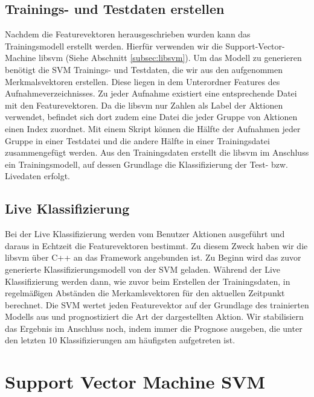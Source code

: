 \subsection{Trainings- und Testdaten erstellen}
\label{subsec:trainings-und-testdaten-erstellen}
Nachdem die Featurevektoren herausgeschrieben wurden kann das Trainingsmodell erstellt werden. Hierfür verwenden wir die Support-Vector-Machine libsvm (Siehe Abschnitt \ref{subsec:libsvm}). Um das Modell zu generieren benötigt die SVM Trainings- und Testdaten, die wir aus den aufgenommen Merkmalsvektoren erstellen. Diese liegen in dem Unterordner \glqq{}Features\grqq{} des Aufnahmeverzeichnisses. Zu jeder Aufnahme existiert eine entsprechende Datei mit den Featurevektoren. Da die libsvm nur Zahlen als Label der Aktionen verwendet, befindet sich dort zudem eine Datei die jeder Gruppe von Aktionen einen Index zuordnet. Mit einem Skript können die Hälfte der Aufnahmen jeder Gruppe in einer Testdatei und die andere Hälfte in einer Trainingsdatei zusammengefügt werden. Aus den Trainingsdaten erstellt die libsvm im Anschluss ein Trainingsmodell, auf dessen Grundlage die Klassifizierung der Test- bzw. Livedaten erfolgt.

\subsection{Live Klassifizierung}
Bei der Live Klassifizierung werden vom Benutzer Aktionen ausgeführt und daraus in Echtzeit die Featurevektoren bestimmt. Zu diesem Zweck haben wir die libsvm über C++ an das Framework angebunden ist. Zu Beginn wird das zuvor generierte Klassifizierungsmodell von der SVM geladen. Während der Live Klassifizierung werden dann, wie zuvor beim Erstellen der Trainingsdaten, in regelmäßigen Abständen die Merkamlsvektoren für den aktuellen Zeitpunkt berechnet. Die SVM wertet jeden Featurevektor auf der Grundlage des trainierten Modells aus und prognostiziert die Art der dargestellten Aktion. Wir stabilisiern das Ergebnis im Anschluss noch, indem immer die Prognose ausgeben, die unter den letzten 10 Klassifizierungen am häufigsten aufgetreten ist. 



\section{Support Vector Machine SVM}
\label{sec:support-vector-machine-svm}

